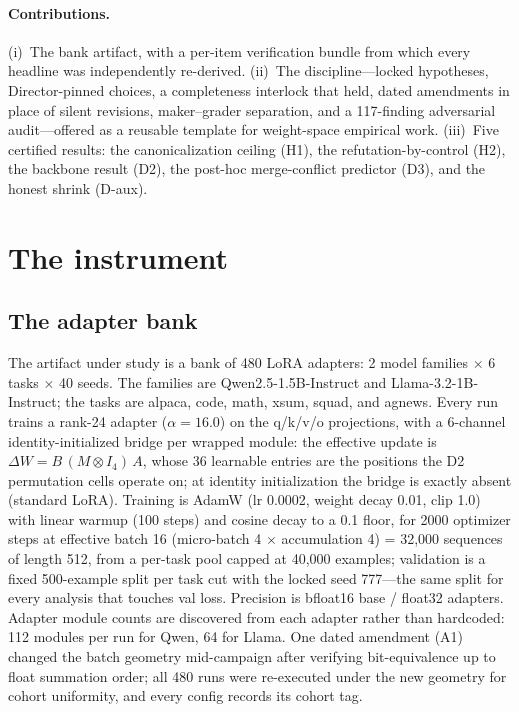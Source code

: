\documentclass[10pt]{article}
\begin{document}
\paragraph{Contributions.} (i)~The bank artifact, with a per-item
verification bundle from which every headline was independently
re-derived. (ii)~The discipline---locked hypotheses, Director-pinned
choices, a completeness interlock that held, dated amendments in place of
silent revisions, maker--grader separation, and a 117-finding adversarial
audit---offered as a reusable template for weight-space empirical work.
(iii)~Five certified results: the canonicalization ceiling (H1), the
refutation-by-control (H2), the backbone result (D2), the post-hoc
merge-conflict predictor (D3), and the honest shrink (D-aux).

\section{The instrument}
\label{sec:instrument}

\subsection{The adapter bank}
\label{sec:bank}

The artifact under study is a bank of 480 LoRA adapters: 2 model families
$\times$ 6 tasks $\times$ 40 seeds. The families are Qwen2.5-1.5B-Instruct
and Llama-3.2-1B-Instruct; the tasks are alpaca, code, math, xsum, squad,
and agnews. Every run trains a rank-24 adapter ($\alpha = 16.0$) on the
q/k/v/o projections, with a 6-channel identity-initialized bridge per
wrapped module: the effective update is $\Delta W = B\,(M \otimes I_4)\,A$,
whose 36 learnable entries are the positions the D2 permutation cells
operate on; at identity initialization the bridge is exactly absent
(standard LoRA). Training is AdamW (lr 0.0002, weight decay 0.01, clip
1.0) with linear warmup (100 steps) and cosine decay to a 0.1 floor, for
2000 optimizer steps at effective batch 16 (micro-batch 4 $\times$
accumulation 4) = 32{,}000 sequences of length 512, from a per-task pool
capped at 40{,}000 examples; validation is a fixed 500-example split per
task cut with the locked seed 777---the same split for every analysis that
touches val loss. Precision is bfloat16 base / float32 adapters. Adapter
module counts are discovered from each adapter rather than hardcoded: 112
modules per run for Qwen, 64 for Llama. One dated amendment (A1) changed
the batch geometry mid-campaign after verifying bit-equivalence up to
float summation order; all 480 runs were re-executed under the new
geometry for cohort uniformity, and every config records its cohort tag.
\end{document}
